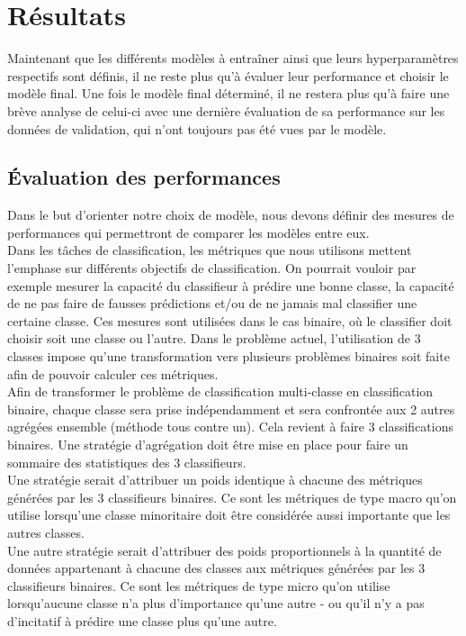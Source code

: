 \section{Résultats}
Maintenant que les différents modèles à entraîner ainsi que leurs hyperparamètres respectifs sont définis, il ne reste plus qu'à évaluer leur performance et choisir le modèle final. Une fois le modèle final déterminé, il ne restera plus qu'à faire une brève analyse de celui-ci avec une dernière évaluation de sa performance sur les données de validation, qui n'ont toujours pas été vues par le modèle.  


\subsection{Évaluation des performances}
Dans le but d'orienter notre choix de modèle, nous devons définir des mesures de performances qui permettront de comparer les modèles entre eux. \\

Dans les tâches de classification, les métriques que nous utilisons mettent l'emphase sur différents objectifs de classification. On pourrait vouloir par exemple mesurer la capacité du classifieur à prédire une bonne classe, la capacité de ne pas faire de fausses prédictions et/ou de ne jamais mal classifier une certaine classe. Ces mesures sont utilisées dans le cas binaire, où le classifier doit choisir soit une classe ou l'autre. Dans le  problème actuel, l'utilisation de 3 classes impose qu'une transformation vers plusieurs problèmes binaires soit faite afin de pouvoir calculer ces métriques. \\

Afin de transformer le problème de classification multi-classe en classification binaire, chaque classe sera prise indépendamment et sera confrontée aux 2 autres agrégées ensemble (méthode tous contre un). Cela revient à faire 3 classifications binaires. Une stratégie d'agrégation doit être mise en place pour faire un sommaire des statistiques des 3 classifieurs. \\ Une stratégie serait d'attribuer un poids identique à chacune des métriques générées par les 3 classifieurs binaires. Ce sont les métriques de type macro qu'on utilise lorsqu'une classe minoritaire doit être considérée aussi importante que les autres classes. \\ Une autre stratégie serait d'attribuer des poids proportionnels à la quantité de données appartenant à chacune des classes aux métriques générées par les 3 classifieurs binaires. Ce sont les métriques de type micro qu'on utilise lorsqu'aucune classe n'a plus d'importance qu'une autre - ou qu'il n'y a pas d'incitatif à prédire une classe plus qu'une autre. \\


